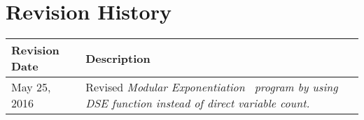 	\thispagestyle{empty}
	\section*{Revision History}
	\begin{tabular}{|p{1in}|p{5.0in}|}	
	\hline 
	\bf Revision Date & \bf Description \\ 
	\hline 
	May 25, 2016 & Revised \it Modular Exponentiation \rm\ program by using DSE function instead of direct variable count.
	\\
	\hline
	\end{tabular} 
	\pagebreak
